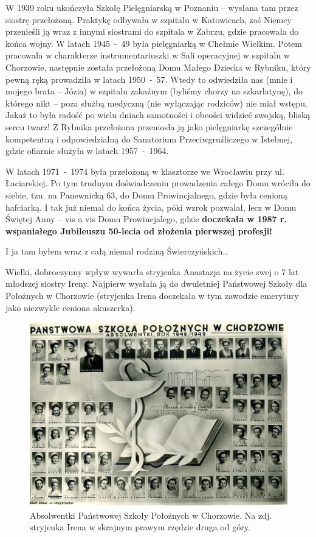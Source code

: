 W 1939 roku ukończyła Szkołę Pielęgniarską w Poznaniu -- wysłana tam przez siostrę przełożoną. Praktykę odbywała w szpitalu w Katowicach, zaś Niemcy przenieśli ją wraz z innymi siostrami do szpitala w Zabrzu, gdzie pracowała do końca wojny. W latach 1945~-~49 była pielęgniarką w Chełmie Wielkim. Potem pracowała w charakterze instrumentariuszki w Sali operacyjnej w szpitalu w Chorzowie, następnie została przełożoną Domu Małego Dziecka w Rybniku, który pewną ręką prowadziła w latach 1950~-~57. Wtedy to odwiedziła nas (mnie i mojego brata -- Józia) w szpitalu zakaźnym (byliśmy chorzy na szkarlatynę), do którego nikt – poza służbą medyczną (nie wyłączając rodziców) nie miał wstępu. Jakaż to była radość po wielu dniach samotności i obcości widzieć swojską, bliską sercu twarz! Z Rybnika przełożona przeniosła ją jako pielęgniarkę szczególnie kompetentną i odpowiedzialną do Sanatorium Przeciwgruźliczego w Istebnej, gdzie ofiarnie służyła w latach 1957~-~1964.

W latach 1971~-~1974 była przełożoną w klasztorze we Wrocławiu przy ul. Łaciarskiej. Po tym trudnym doświadczeniu prowadzenia całego Domu wróciła do siebie, tzn. na Panewnicką 63, do Domu Prowincjalnego, gdzie była cenioną hafciarką. I tak już niemal do końca życia, póki wzrok pozwalał, lecz w Domu Świętej Anny -- vis a vis Domu Prowincjalego, gdzie \textbf{doczekała w 1987 r. wspaniałego Jubileuszu 50-lecia od złożenia pierwszej profesji!} 

I ja tam byłem wraz z całą niemal rodziną Świerczyńskich\ldots

Wielki, dobroczynny wpływ wywarła stryjenka Anastazja na życie swej o 7 lat młodszej siostry Ireny. Najpierw wysłała ją do dwuletniej Państwowej Szkoły dla Położnych w Chorzowie (stryjenka Irena doczekała w tym zawodzie emerytury jako niezwykle ceniona akuszerka).
\begin{figure}[!h]
\begin{center}
\includegraphics[width=\textwidth]{photo/szkola_poloznych_w_chorzowie.jpg}
\caption[Absolwentki Państwowej Szkoły Położnych w Chorzowie.]{Absolwentki Państwowej Szkoły Położnych w Chorzowie. Na zdj. stryjenka Irena w skrajnym prawym rzędzie druga od góry.}
\label{rys:szkola_poloznych_w_chorzowie}
\end{center}
\end{figure}

